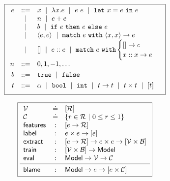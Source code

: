 \begin{figure}
\centering
\begin{minipage}[c]{.4\textwidth}
\[
\boxed{
\begin{array}{rcl}
e & ::=    & x \ \mid\  \lambda x. e \ \mid\  e\ e \ \mid\  \mathtt{let}\ x = e\ \mathtt{in}\ e \\
  & \ \mid\  & n \ \mid\  e + e\\
  & \ \mid\  & b \ \mid\  \mathtt{if}\ e\ \mathtt{then}\ e\ \mathtt{else}\ e \\
  & \ \mid\  & \langle e, e \rangle \ \mid\  \mathtt{match}\ e\ \mathtt{with}\ \langle x, x \rangle \to e \\
  & \ \mid\  & \mathtt{[]} \ \mid\  e :: e \ \mid\  \mathtt{match}\ e\ \mathtt{with} \begin{cases} \mathtt{[]} \to e\\ x :: x \to e \end{cases} \\[0.05in]

n & ::= &  0, 1, -1, \ldots \\[0.05in]

b & ::= &  \mathtt{true} \ \mid\  \mathtt{false} \\[0.05in]

t & ::= & \alpha \ \mid\  \mathtt{bool} \ \mid\  \mathtt{int} \ \mid\  t \to t \ \mid\  t \times t \ \mid\  [t] \\[0.05in]
\end{array}
}
\]
\label{fig:syntax}
\end{minipage}
\hfill
\begin{minipage}[c]{.45\textwidth}
\lstDeleteShortInline{|} %
\[
\boxed{
\begin{array}{lcl}
  \V          & \defeq & \List{\R}\\
  \Runit      & \defeq & \{r \in \R\ |\ 0 \le r \le 1\} \\ %
  \featuresym & : & \List{e \to \R} \\
  \labelsym   & : & e \times e \to \List{e} \\
  \extractsym & : & \List{e \to \R} \to e \times e \to \List{\V \times \B} \\
  \trainsym   & : & \List{\V \times \B} \to \Model \\
  \evalsym    & : & \Model \to \V \to \Runit \\
  \midrule
  \blamesym   & : & \Model \to e \to \List{e \times \Runit}
\end{array}
}
\]
\lstMakeShortInline{|}
\label{fig:api}
\end{minipage}
\end{figure}
